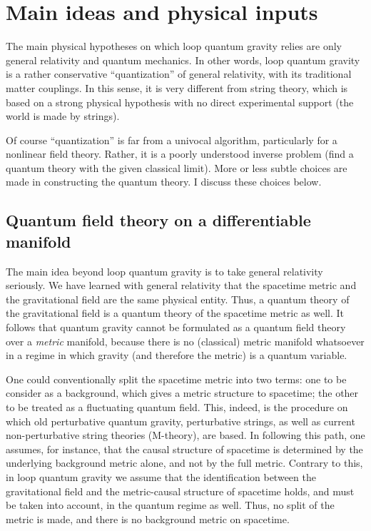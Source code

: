 \documentclass[12pt]{article}
\begin{document}
\section{Main ideas and physical inputs}\label{4}

The main physical hypotheses on which loop quantum gravity relies 
are only general relativity and quantum mechanics.  In other 
words, loop quantum gravity is a rather conservative 
``quantization'' of general relativity,  with its 
traditional matter couplings.  In this sense, it is very 
different from string theory, which is based on a strong physical 
hypothesis with no direct experimental support (the world 
is made by strings).  

Of course ``quantization'' is far from a univocal algorithm, 
particularly for a nonlinear field theory.  Rather, it is a poorly 
understood inverse problem (find a quantum theory with the given 
classical limit).  More or less subtle choices are made in 
constructing the quantum theory.  I discuss these choices below.

\subsection{Quantum field theory on a differentiable manifold}

The main idea beyond loop quantum gravity is to take general 
relativity seriously.  We have learned with general relativity 
that the spacetime metric and the gravitational field are the same 
physical entity.  Thus, a quantum theory of the gravitational 
field is a quantum theory of the spacetime metric as well.  It 
follows that quantum gravity cannot be formulated as a quantum 
field theory over a {\em metric\/} manifold, because there is no 
(classical) metric manifold whatsoever in a regime in which 
gravity (and therefore the metric) is a quantum variable.

One could conventionally split the spacetime metric into two 
terms: one to be consider as a background, which gives a metric 
structure to spacetime; the other to be treated as a fluctuating 
quantum field.  This, indeed, is the procedure on which old 
perturbative quantum gravity, perturbative strings, as well as 
current non-perturbative string theories (M-theory), are based.  
In following this path, one assumes, for instance, that the 
causal structure of spacetime is determined by the underlying 
background metric alone, and not by the full metric.  Contrary to 
this, in loop quantum gravity we assume that the identification 
between the gravitational field and the metric-causal structure 
of spacetime holds, and must be taken into account, in the 
quantum regime as well.  Thus, no split of the metric is made, 
and there is no background metric on spacetime.
\end{document}
